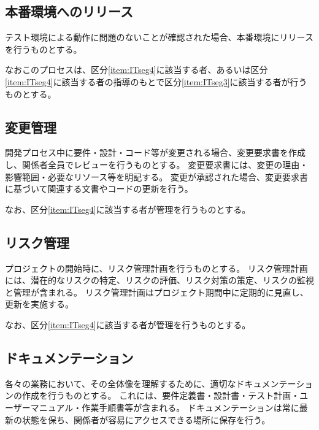 \subsection{本番環境へのリリース}
テスト環境による動作に問題のないことが確認された場合、本番環境にリリースを行うものとする。

なおこのプロセスは、区分\ref{item:ITseg4}\hx に該当する者、あるいは区分\ref{item:ITseg4}\hx に該当する者の指導のもとで区分\ref{item:ITseg3}\hx に該当する者が行うものとする。

\subsection{変更管理}
開発プロセス中に要件・設計・コード等が変更される場合、変更要求書を作成し、関係者全員でレビューを行うものとする。
変更要求書には、変更の理由・影響範囲・必要なリソース等を明記する。
変更が承認された場合、変更要求書に基づいて関連する文書やコードの更新を行う。

なお、区分\ref{item:ITseg4}\hx に該当する者が管理を行うものとする。

\subsection{リスク管理}
プロジェクトの開始時に、リスク管理計画を行うものとする。
リスク管理計画には、潜在的なリスクの特定、リスクの評価、リスク対策の策定、リスクの監視と管理が含まれる。
リスク管理計画はプロジェクト期間中に定期的に見直し、更新を実施する。

なお、区分\ref{item:ITseg4}\hx に該当する者が管理を行うものとする。

\subsection{ドキュメンテーション}
各々の業務において、その全体像を理解するために、適切なドキュメンテーションの作成を行うものとする。
これには、要件定義書・設計書・テスト計画・ユーザーマニュアル・作業手順書等が含まれる。
ドキュメンテーションは常に最新の状態を保ち、関係者が容易にアクセスできる場所に保存を行う。

